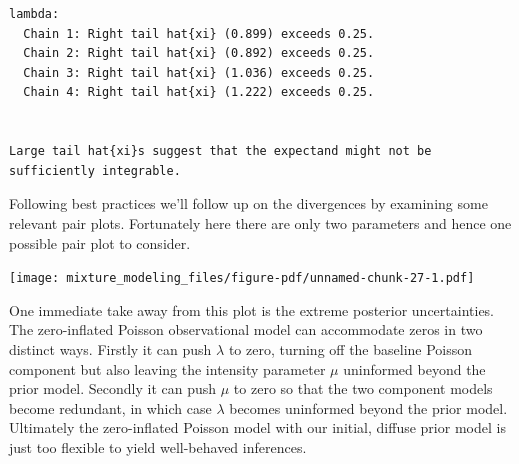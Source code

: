 \documentclass[
  letterpaper,
  DIV=11,
  numbers=noendperiod]{scrartcl}
\newenvironment{Shaded}{\begin{snugshade}}{\end{snugshade}}
\newcommand{\AttributeTok}[1]{\textcolor[rgb]{0.40,0.45,0.13}{#1}}
\newcommand{\FunctionTok}[1]{\textcolor[rgb]{0.28,0.35,0.67}{#1}}
\newcommand{\NormalTok}[1]{\textcolor[rgb]{0.00,0.23,0.31}{#1}}
\newcommand{\OtherTok}[1]{\textcolor[rgb]{0.00,0.23,0.31}{#1}}
\newcommand{\SpecialCharTok}[1]{\textcolor[rgb]{0.37,0.37,0.37}{#1}}
\newcommand{\StringTok}[1]{\textcolor[rgb]{0.13,0.47,0.30}{#1}}
\begin{document}
\begin{Shaded}
\end{Shaded}

\begin{verbatim}
lambda:
  Chain 1: Right tail hat{xi} (0.899) exceeds 0.25.
  Chain 2: Right tail hat{xi} (0.892) exceeds 0.25.
  Chain 3: Right tail hat{xi} (1.036) exceeds 0.25.
  Chain 4: Right tail hat{xi} (1.222) exceeds 0.25.


Large tail hat{xi}s suggest that the expectand might not be
sufficiently integrable.
\end{verbatim}

Following best practices we'll follow up on the divergences by examining
some relevant pair plots. Fortunately here there are only two parameters
and hence one possible pair plot to consider.

\begin{Shaded}
\end{Shaded}

\texttt{[image: mixture\_modeling\_files/figure-pdf/unnamed-chunk-27-1.pdf]}

One immediate take away from this plot is the extreme posterior
uncertainties. The zero-inflated Poisson observational model can
accommodate zeros in two distinct ways. Firstly it can push \(\lambda\)
to zero, turning off the baseline Poisson component but also leaving the
intensity parameter \(\mu\) uninformed beyond the prior model. Secondly
it can push \(\mu\) to zero so that the two component models become
redundant, in which case \(\lambda\) becomes uninformed beyond the prior
model. Ultimately the zero-inflated Poisson model with our initial,
diffuse prior model is just too flexible to yield well-behaved
inferences.
\end{document}
